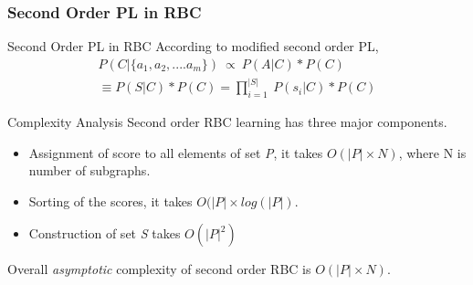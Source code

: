 \documentclass[10pt, blue,subsection=true, compress]{beamer}
\begin{document}
\begin{frame}\frametitle{Second Order PL in RBC}
\begin{block}{Second Order PL in RBC}
According to modified second order PL,  
\begin{align}
\nonumber
 P(C | \{a_1,a_2,....a_m\}) ~ \propto ~ P(A | C)*P(C) \\
\equiv P(S | C)*P(C)=  \prod_{i=1}^{|S|} ~ P(s_i | C)*P(C)
\end{align}
\end{block}
\begin{block}{Complexity Analysis}
Second order RBC learning has three major components. 
\begin{itemize}
 \item Assignment of score to all elements of set \textit{P}, it takes $O(|P|\times N)$, where N is number of subgraphs.
\item Sorting of the scores, it takes $O(|P| \times log(|P|)$. 
\item Construction of set \textit{S} takes $O(|P|^2)$
\end{itemize}
Overall \emph{asymptotic} complexity of second order RBC is $O(|P|\times N)$.
\end{block}
\end{frame}

\end{document}

